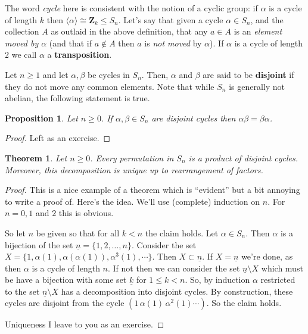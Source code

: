 \documentclass[12pt]{article}
\numberwithin{equation}{subsection}
\newtheorem{thm}[subsection]{Theorem}
\newtheorem{prop}[subsection]{Proposition}
\theoremstyle{note}
\begin{document}
The word \textit{cycle} here is consistent with the notion of a cyclic group: if $\alpha$ is a cycle of length $k$ then $\langle \alpha\rangle \cong \mathbf{Z}_k\leq S_n$. Let's say that given a cycle $\alpha\in S_n$, and the collection $A$ as outlaid in the above definition, that any $a\in A$ is an \textit{element moved by $\alpha$} (and that if $a\notin A$ then $a$ is \textit{not moved} by $\alpha$). If $\alpha$ is a cycle of length $2$ we call $\alpha$ a \textbf{transposition}.

Let $n\geq 1$ and let $\alpha, \beta$ be cycles in $S_n$. Then, $\alpha$ and $\beta$ are said to be \textbf{disjoint} if they do not move any common elements. Note that while $S_n$ is generally not abelian, the following statement is true.

\begin{prop} \label{disjoint-cycles-commute}
	Let $n\geq 0$. If $\alpha,\beta \in S_n$ are disjoint cycles then $\alpha\beta=\beta\alpha$.
\end{prop} 

\begin{proof}
	Left as an exercise.
\end{proof}

\begin{thm}\label{disjoint-cycles}
	Let $n\geq 0$. Every permutation in $S_n$ is a product of disjoint cycles. Moreover, this decomposition is unique up to rearrangement of factors. 
\end{thm}
\begin{proof}
	This is a nice example of a theorem which is ``evident'' but a bit annoying to write a proof of. Here's the idea. We'll use (complete) induction on $n$. For $n=0,1$ and $2$ this is obvious. 
	
	So let $n$ be given so that for all $k<n$ the claim holds. Let $\alpha\in S_n$. Then $\alpha$ is a bijection of the set $\underline{n}=\{1,2,\dots, n\}$. Consider the set $X=\{1,\alpha(1), \alpha(\alpha(1)), \alpha^3(1),\cdots\}$. Then $X\subset \underline{n}$. If $X=\underline{n}$ we're done, as then $\alpha$ is a cycle of length $n$. If not then we can consider the set $\underline{n}\setminus X$ which must be have a bijection with some set $\underline{k}$ for $1\leq k < n$. So, by induction $\alpha$ restricted to the set $\underline{n}\setminus X$ has a decomposition into disjoint cycles. By construction, these cycles are disjoint from the cycle $(1 \, \alpha(1) \, \alpha^2(1) \cdots)$. So the claim holds. 
	
		Uniqueness I leave to you as an exercise. 
\end{proof}
\end{document}
